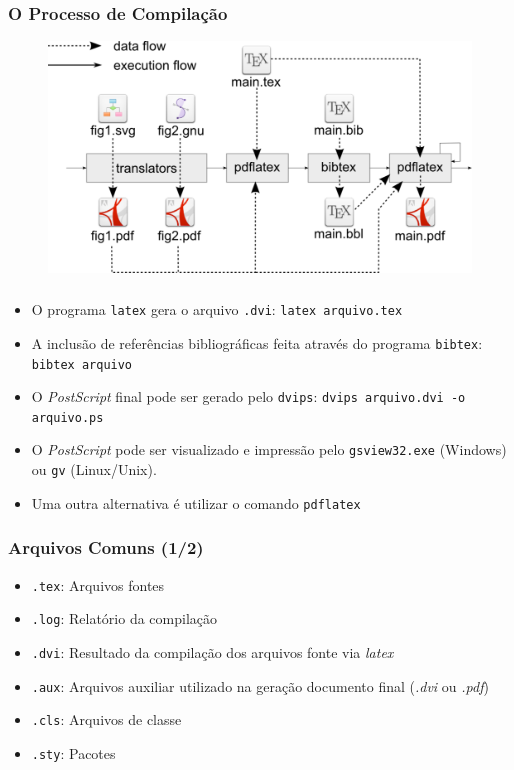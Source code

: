 \begin{frame}
\frametitle{O Processo de Compilação}


\begin{figure}
\centering
 \includegraphics[scale=.25]{../img/process.pdf}
\end{figure}
 
\end{frame}

\begin{frame}[fragile]
\frametitle{}

\begin{itemize}
  \item O programa \texttt{latex} gera o arquivo \texttt{.dvi}: \texttt{latex arquivo.tex}
  \item A inclusão de referências bibliográficas feita através do programa \texttt{bibtex}:
  \texttt{bibtex arquivo}
  \item O \textit{PostScript} final pode ser gerado pelo \texttt{dvips}: \texttt{dvips arquivo.dvi
  -o arquivo.ps}
  \item O \textit{PostScript} pode ser visualizado e impressão pelo \texttt{gsview32.exe} (Windows)
  ou \texttt{gv} (Linux/Unix).
  \item Uma outra alternativa é utilizar o comando \texttt{pdflatex}
\end{itemize}
 
\end{frame}

\begin{frame}
\frametitle{Arquivos Comuns (1/2)}

\begin{itemize}
  \item \texttt{.tex}: Arquivos fontes
  \item \texttt{.log}: Relatório da compilação
  \item \texttt{.dvi}: Resultado da compilação dos arquivos fonte via \textit{latex}
  \item \texttt{.aux}: Arquivos auxiliar utilizado na geração documento final (\textit{.dvi} ou
  	\textit{.pdf})
  \item \texttt{.cls}: Arquivos de classe
  \item \texttt{.sty}: Pacotes
\end{itemize}
 
\end{frame}

